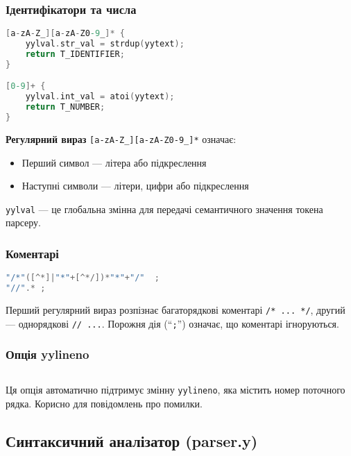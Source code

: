 \documentclass[12pt,a4paper]{article}
\begin{document}
\subsubsection{Ідентифікатори та числа}

\begin{lstlisting}[language=C]
[a-zA-Z_][a-zA-Z0-9_]* {
    yylval.str_val = strdup(yytext);
    return T_IDENTIFIER;
}

[0-9]+ {
    yylval.int_val = atoi(yytext);
    return T_NUMBER;
}
\end{lstlisting}

\textbf{Регулярний вираз} \texttt{[a-zA-Z\_][a-zA-Z0-9\_]*} означає:
\begin{itemize}
    \item Перший символ --- літера або підкреслення
    \item Наступні символи --- літери, цифри або підкреслення
\end{itemize}

\texttt{yylval} --- це глобальна змінна для передачі семантичного значення токена парсеру.

\subsubsection{Коментарі}

\begin{lstlisting}[language=C]
"/*"([^*]|"*"+[^*/])*"*"+"/"  ; 
"//".* ; 
\end{lstlisting}

Перший регулярний вираз розпізнає багаторядкові коментарі \texttt{/* ... */}, другий --- однорядкові \texttt{// ...}. Порожня дія (``\texttt{;}'') означає, що коментарі ігноруються.

\subsubsection{Опція yylineno}

\begin{lstlisting}[language=C]
%option yylineno
\end{lstlisting}

Ця опція автоматично підтримує змінну \texttt{yylineno}, яка містить номер поточного рядка. Корисно для повідомлень про помилки.

\subsection{Синтаксичний аналізатор (parser.y)}
\end{document}
